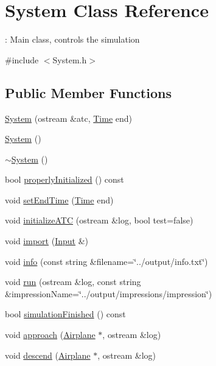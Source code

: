 \hypertarget{classSystem}{}\section{System Class Reference}
\label{classSystem}


\+: Main class, controls the simulation  




{\ttfamily \#include $<$System.\+h$>$}

\subsection*{Public Member Functions}
\begin{DoxyCompactItemize}
\item 
\hyperlink{classSystem_a91b8a63b48be9eeedb59c23c884e6ec1}{System} (ostream \&atc, \hyperlink{classTime}{Time} end)
\item 
\hyperlink{classSystem_ae317936c9bcf1374d61745572e0f2f8a}{System} ()
\item 
\hyperlink{classSystem_a3be70bb338e3f062f821173fd15680d0}{$\sim$\+System} ()
\item 
bool \hyperlink{classSystem_af3eece83ba2d92a4a6b6c186d427c556}{properly\+Initialized} () const 
\item 
void \hyperlink{classSystem_adccb3f18f20203bcce0b2064f6c07cda}{set\+End\+Time} (\hyperlink{classTime}{Time} end)
\item 
void \hyperlink{classSystem_a5e9a3f6b8d3d5cb99c041bfcaace9683}{initialize\+A\+TC} (ostream \&log, bool test=false)
\item 
void \hyperlink{classSystem_ad1f1022247d9556d0ce4061bb68572cc}{import} (\hyperlink{classInput}{Input} \&)
\item 
void \hyperlink{classSystem_ac8c74374e12e2c1b763bf73a1e1e8b24}{info} (const string \&filename=\char`\"{}../output/info.\+txt\char`\"{})
\item 
void \hyperlink{classSystem_ae6323968b33e7a955d612b52c9c1cff7}{run} (ostream \&log, const string \&impression\+Name=\char`\"{}../output/impressions/impression\char`\"{})
\item 
bool \hyperlink{classSystem_abae43adfa434ace30ef85c69a7842289}{simulation\+Finished} () const 
\item 
void \hyperlink{classSystem_a928c7d35bae07db74b8c3187239455da}{approach} (\hyperlink{classAirplane}{Airplane} $\ast$, ostream \&log)
\item 
void \hyperlink{classSystem_a748d0e1f37ed54f658f1caf3cc9972e9}{descend} (\hyperlink{classAirplane}{Airplane} $\ast$, ostream \&log)

\end{DoxyCompactItemize}
